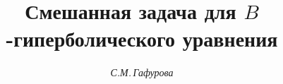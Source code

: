 






\renewcommand{\baselinestretch}{1.07}


\newcommand{\tts}[1]{}







\setcounter{page}{70}















\author{\it С.М.\,Гафурова}




\title{Смешанная задача для $B$-гиперболического уравнения}





\date{}




\pagestyle{plain} %







\maketitle


\label{begin}











